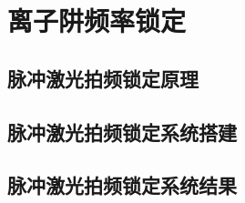 
\chapter[离子阱频率锁定]{离子阱频率锁定}

\section[离子阱频率锁定原理]{脉冲激光拍频锁定原理}

\section[离子阱频率锁定系统搭建]{脉冲激光拍频锁定系统搭建}

\section[离子阱频率锁定系统结果]{脉冲激光拍频锁定系统结果}